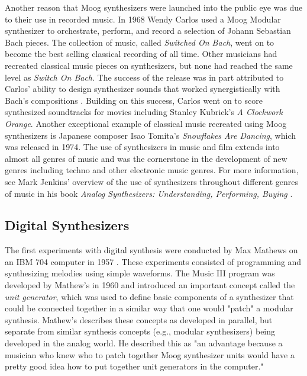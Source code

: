 Another reason that Moog synthesizers were launched into the public eye was due to  their use in recorded music. In 1968 Wendy Carlos used a Moog Modular synthesizer to orchestrate, perform, and record a selection of Johann Sebastian Bach pieces. The collection of music, called \textit{Switched On Bach}, went on to become the best selling classical recording of all time. Other musicians had recreated classical music pieces on synthesizers, but none had reached the same level as \textit{Switch On Bach}. The success of the release was in part attributed to Carlos' ability to design synthesizer sounds that worked synergistically with Bach's compositions \cite{jenkins2019analog}. Building on this success, Carlos went on to score synthesized soundtracks for movies including Stanley Kubrick's \textit{A Clockwork Orange}. Another exceptional example of classical music recreated using Moog synthesizers is Japanese composer Isao Tomita's \textit{Snowflakes Are Dancing}, which was released in 1974. The use of synthesizers in music and film extends into almost all genres of music and was the cornerstone in the development of new genres including techno and other electronic music genres. For more information, see Mark Jenkins' overview of the use of synthesizers throughout different genres of music in his book \textit{Analog Synthesizers: Understanding, Performing, Buying} \cite{jenkins2019analog}.

\subsection{Digital Synthesizers}
The first experiments with digital synthesis were conducted by Max Mathews on an IBM 704 computer in 1957 \cite{roads1980interview}. These experiments consisted of programming and synthesizing melodies using simple waveforms. The Music III program was developed by Mathew's in 1960 and introduced an important concept called the \textit{unit generator}, which was used to define basic components of a synthesizer that could be connected together in a similar way that one would "patch" a modular synthesis. Mathew's describes these concepts as developed in parallel, but separate from similar synthesis concepts (e.g., modular synthesizers) being developed in the analog world. He described this as "an advantage because a musician who knew who to patch together Moog synthesizer units would have a pretty good idea how to put together unit generators in the computer."

